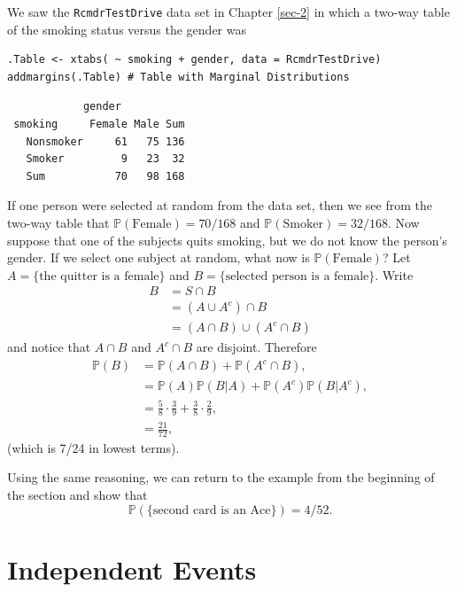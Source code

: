 \documentclass[captions=tableheading]{scrbook}
\begin{document}
\begin{example}
We saw the \texttt{RcmdrTestDrive} data set in Chapter \ref{sec-2} in which a two-way table of the smoking status versus the gender was 


\lstset{language=R}
\begin{lstlisting}
.Table <- xtabs( ~ smoking + gender, data = RcmdrTestDrive)
addmargins(.Table) # Table with Marginal Distributions
\end{lstlisting}

\begin{verbatim}
            gender
 smoking     Female Male Sum
   Nonsmoker     61   75 136
   Smoker         9   23  32
   Sum           70   98 168
\end{verbatim}

If one person were selected at random from the data set, then we see from the two-way table that \(\mathbb{P}(\mbox{Female})=70/168\) and \(\mathbb{P}(\mbox{Smoker})=32/168\). Now suppose that one of the subjects quits smoking, but we do not know the person's gender. If we select one subject at random, what now is \(\mathbb{P}(\mbox{Female})\)? Let \( A = \{ \mbox{the quitter is a female} \} \) and \( B = \{ \mbox{selected person is a female} \} \). Write
\begin{align*}
B & =S\cap B\\
 & =(A\cup A^{c})\cap B\\
 & =(A\cap B)\cup(A^{c}\cap B)
\end{align*}
and notice that \(A\cap B\) and \(A^{c}\cap B\) are disjoint. Therefore
\begin{align*}
\mathbb{P}(B) & =\mathbb{P}(A\cap B)+\mathbb{P}(A^{c}\cap B),\\
 & =\mathbb{P}(A)\mathbb{P}(B|A)+\mathbb{P}(A^{c})\mathbb{P}(B|A^{c}),\\
 & =\frac{5}{8}\cdot\frac{3}{9}+\frac{3}{8}\cdot\frac{2}{9},\\
 & =\frac{21}{72},
\end{align*}
(which is 7/24 in lowest terms).

\end{example}
Using the same reasoning, we can return to the example from the beginning of the section and show that
\[
\mathbb{P}(\{ \mbox{second card is an Ace} \} )=4/52.
\]
 
\section{Independent Events}
\label{sec-4-7}
\label{sec-Independent-Events}
\end{document}
